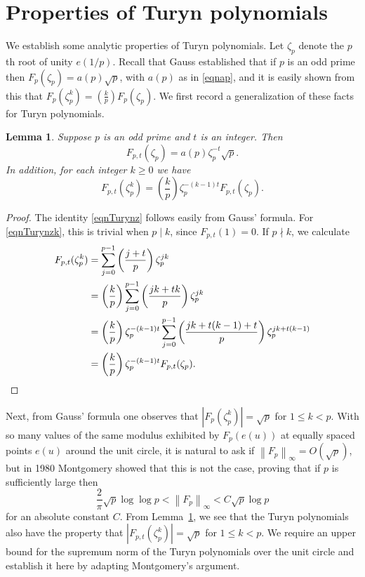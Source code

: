 \documentclass[reqno]{amsart}
\newtheorem{lemma}[theorem]{Lemma}
\numberwithin{equation}{section}
\numberwithin{table}{section}
\numberwithin{figure}{section}
\newcommand{\leg}[2]{\left(\frac{#1}{#2}\right)}
\newcommand{\abs}[1]{\left\lvert#1\right\rvert}
\newcommand{\dbars}[1]{\left\lVert#1\right\rVert}
\begin{document}
\section{Properties of Turyn polynomials}\label{secProperties}

We establish some analytic properties of Turyn polynomials.
Let $\zeta_p$ denote the $p$th root of unity $e(1/p)$.
Recall that Gauss established that if $p$ is an odd prime then $F_p(\zeta_p) = a(p) \sqrt{p}$, with $a(p)$ as in \eqref{eqnap}, and it is easily shown from this that $F_p(\zeta_p^k) = \leg{k}{p} F_p(\zeta_p)$.
We first record a generalization of these facts for Turyn polynomials.

\begin{lemma}\label{lemmaGaussSum}
Suppose $p$ is an odd prime and $t$ is an integer.
Then
\begin{equation}\label{eqnTurynz}
F_{p,t}(\zeta_p) = a(p) \zeta_p^{-t} \sqrt{p}.
\end{equation}
In addition, for each integer $k\geq0$ we have
\begin{equation}\label{eqnTurynzk}
F_{p,t}(\zeta_p^k) = \leg{k}{p}\zeta_p^{-(k-1)t} F_{p,t}(\zeta_p).
\end{equation}
\end{lemma}

\begin{proof}
The identity \eqref{eqnTurynz} follows easily from Gauss' formula.
For \eqref{eqnTurynzk}, this is trivial when $p\mid k$, since $F_{p,t}(1)=0$.
If $p\nmid k$, we calculate
\begin{align*}
F_{p,t}(\zeta_p^k)
   &= \sum_{j=0}^{p-1}\leg{j+t}{p} \zeta_p^{jk}\\
   &= \leg{k}{p} \sum_{j=0}^{p-1} \leg{jk+tk}{p} \zeta_p^{jk}\\
   &= \leg{k}{p} \zeta_p^{-(k-1)t} \sum_{j=0}^{p-1} \leg{jk+t(k-1)+t}{p}\zeta_p^{jk+t(k-1)}\\
   &= \leg{k}{p}\zeta_p^{-(k-1)t} F_{p,t}(\zeta_p).
\qedhere
\end{align*}
\end{proof}

Next, from Gauss' formula one observes that $\abs{F_p(\zeta_p^k)} = \sqrt{p}$ for $1\leq k < p$.
With so many values of the same modulus exhibited by $F_p(e(u))$ at equally spaced points $e(u)$ around the unit circle, it is natural to ask if $\dbars{F_p}_\infty = O(\sqrt{p})$, but in 1980 Montgomery \cite{Montgomery80} showed that this is not the case, proving that if $p$ is sufficiently large then
\[
\frac{2}{\pi} \sqrt{p} \log\log p < \dbars{F_p}_\infty < C \sqrt{p} \log p
\]
for an absolute constant $C$.
From Lemma~\ref{lemmaGaussSum}, we see that the Turyn polynomials also have the property that $\abs{F_{p,t}(\zeta_p^k)} = \sqrt{p}$ for $1\leq k<p$.
We require an upper bound for the supremum norm of the Turyn polynomials over the unit circle and establish it 
here by adapting Montgomery's argument.
\end{document}
